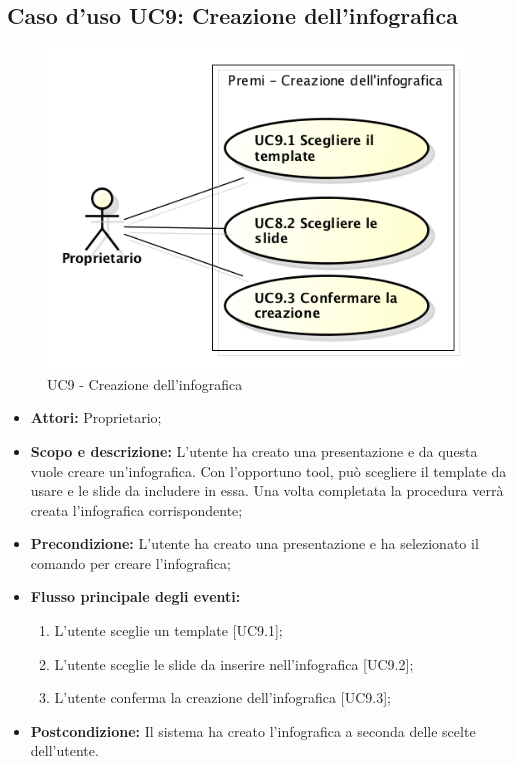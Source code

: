 \subsection{Caso d'uso UC9: Creazione dell'infografica}
\begin{figure}[h] 
	\centering 
	\includegraphics[scale=0.45] {img/UC9.png} 
	\caption{UC9 - Creazione dell'infografica} 
\end{figure}

\begin{itemize}
	\item \textbf{Attori:} Proprietario;
	\item \textbf{Scopo e descrizione:} L'utente ha creato una presentazione e da questa vuole creare un'infografica. Con l'opportuno tool, può scegliere il template da usare e le slide da includere in essa. Una volta completata la procedura verrà creata l'infografica corrispondente;
	\item \textbf{Precondizione:} L'utente ha creato una presentazione e ha selezionato il comando per creare l'infografica;
	
	\item \textbf{Flusso principale degli eventi:}
	\begin{enumerate}
		\item L'utente sceglie un template [UC9.1];
		\item L'utente sceglie le slide da inserire nell'infografica [UC9.2];
		\item L'utente conferma la creazione dell'infografica [UC9.3];
	\end{enumerate}
	\item \textbf{Postcondizione:} Il sistema ha creato l'infografica a seconda delle scelte dell'utente.
\end{itemize}


